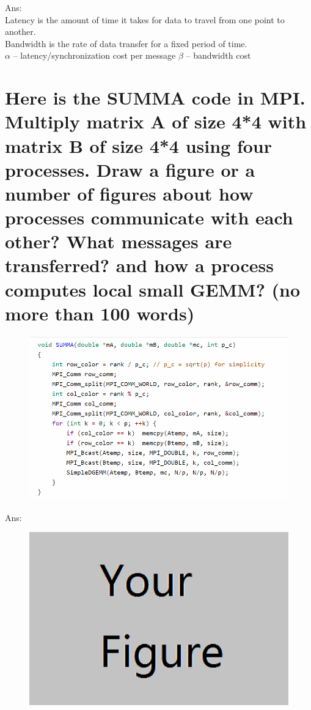\documentclass{article}
\begin{document}
Ans:%
~\\Latency is the amount of time it takes for data to travel from one point to another.
\\Bandwidth is the rate of data transfer for a fixed period of time.
\\$\alpha$ – latency/synchronization cost per message $\beta$ – bandwidth cost
\section{Here is the SUMMA code in MPI. Multiply matrix A of size 4*4 with matrix B of size 4*4 using four processes. Draw a figure or a number of figures about how processes communicate with each other? What messages are transferred? and how a process computes local small GEMM? (no more than 100 words)}
\begin{figure}[H]
\centering
\includegraphics[width=5in]{mpi-summa.png}
\end{figure}

Ans:%

\begin{figure}[ht]
\centering
\includegraphics[width=5in]{example.png}
\end{figure}
~\\


\end{document}
